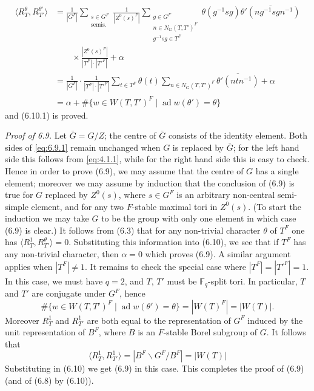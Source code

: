 \documentclass[11pt]{amsart}
\theoremstyle{plain}
\theoremstyle{remark}
\DeclareMathOperator{\ad}{ad}
\begin{document}
\begin{align*}
\langle R_T^\theta, R_{T'}^{\theta'} \rangle &= \frac{1}{|G^F|} \sum_{\substack{s \in G^F \\ \text{semis.}}} \frac{1}{|Z^0(s)^F|} \sum_{\substack{g \in G^F \\ n \in N_G(T, T')^F \\ g^{-1}sg \in T^F}} \theta(g^{-1}sg)\overline{\theta'(ng^{-1}sgn^{-1})} \\
&\qquad \times \frac{|Z^0(s)^F|}{|T^F| \cdot |T'^F|} + \alpha \\
&= \frac{1}{|G^F|} \cdot \frac{1}{|T^F| \cdot |T'^F|} \sum_{t \in T^F} \theta(t) \sum_{n \in N_G(T, T')^F} \overline{\theta'(ntn^{-1})} + \alpha \\
&= \alpha + \#\{w \in W(T, T')^F \mid \ad w(\theta') = \theta\}
\end{align*}
and (6.10.1) is proved.

\textit{Proof of 6.9.} Let $\bar{G} = G/Z$; the centre of $\bar{G}$ consists of the identity element. Both sides of \eqref{eq:6.9.1} remain unchanged when $G$ is replaced by $\bar{G}$; for the left hand side this follows from \eqref{eq:4.1.1}, while for the right hand side this is easy to check. Hence in order to prove (6.9), we may assume that the centre of $G$ has a single element; moreover we may assume by induction that the conclusion of (6.9) is true for $G$ replaced by $Z^0(s)$, where $s \in G^F$ is an arbitrary non-central semi-simple element, and for any two $F$-stable maximal tori in $Z^0(s)$. (To start the induction we may take $G$ to be the group with only one element in which case (6.9) is clear.) It follows from (6.3) that for any non-trivial character $\theta$ of $T^F$ one has $\langle R_T^1, R_{T'}^\theta \rangle = 0$. Substituting this information into (6.10), we see that if $T^F$ has any non-trivial character, then $\alpha = 0$ which proves (6.9). A similar argument applies when $|T^F| \neq 1$. It remains to check the special case where $|T^F| = |T'^F| = 1$. In this case, we must have $q = 2$, and $T$, $T'$ must be $\mathbb{F}_q$-split tori. In particular, $T$ and $T'$ are conjugate under $G^F$, hence
\[
\#\{w \in W(T, T')^F \mid \ad w(\theta') = \theta\} = |W(T)^F| = |W(T)|.
\]
Moreover $R_T^1$ and $R_{T'}^1$ are both equal to the representation of $G^F$ induced by the unit representation of $B^F$, where $B$ is an $F$-stable Borel subgroup of $G$. It follows that
\begin{equation}\label{eq:1.10}
\langle R_T^1, R_{T'}^1 \rangle = |B^F \backslash G^F / B^F| = |W(T)|
\end{equation}
Substituting in (6.10) we get (6.9) in this case. This completes the proof of (6.9) (and of (6.8) by (6.10)).
\end{document}
